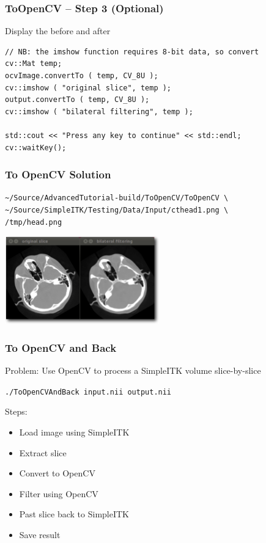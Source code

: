 \begin{frame}[fragile]
\frametitle{ToOpenCV -- Step 3 (Optional)}
Display the before and after
\lstcppa
\begin{lstlisting}
// NB: the imshow function requires 8-bit data, so convert
cv::Mat temp;
ocvImage.convertTo ( temp, CV_8U );
cv::imshow ( "original slice", temp );
output.convertTo ( temp, CV_8U );
cv::imshow ( "bilateral filtering", temp );

std::cout << "Press any key to continue" << std::endl;
cv::waitKey();
\end{lstlisting}
\end{frame}

\begin{frame}[fragile]
\frametitle{To OpenCV Solution}
\texttt{\textasciitilde/Source/AdvancedTutorial-build/ToOpenCV/ToOpenCV \textbackslash \\
  \textasciitilde/Source/SimpleITK/Testing/Data/Input/cthead1.png \textbackslash \\
/tmp/head.png}
\begin{center}
  \includegraphics[width=0.5\textwidth]{Images/ToOpenCVSolution_shadow}
\end{center}
\end{frame}


\begin{frame}[fragile]
\frametitle{To OpenCV and Back}
Problem: Use OpenCV to process a SimpleITK volume slice-by-slice

\texttt{./ToOpenCVAndBack input.nii output.nii}

Steps:
\begin{itemize}
\item Load image using SimpleITK
\item Extract slice
\item Convert to OpenCV
\item Filter using OpenCV
\item Past slice back to SimpleITK
\item Save result
\end{itemize}
\end{frame}


